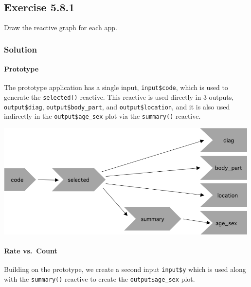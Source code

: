\documentclass[]{book}
\let\oldparagraph\paragraph
\renewcommand{\paragraph}[1]{\oldparagraph{#1}\mbox{}}
\begin{document}
\hypertarget{exercise-5.8.1}{%
\subsection*{Exercise 5.8.1}\label{exercise-5.8.1}}

Draw the reactive graph for each app.

\begin{solution}

\hypertarget{solution}{%
\subsubsection*{Solution}\label{solution}}

\hypertarget{prototype}{%
\paragraph{Prototype}\label{prototype}}

The prototype application has a single input, \texttt{input\$code}, which is used to
generate the \texttt{selected()} reactive. This reactive is used directly in 3
outputs, \texttt{output\$diag}, \texttt{output\$body\_part}, and \texttt{output\$location}, and it is
also used indirectly in the \texttt{output\$age\_sex} plot via the \texttt{summary()} reactive.

\includegraphics[width=5.20833in,height=\textheight]{images/5.8.1-prototype.png}

\hypertarget{rate-vs.count}{%
\paragraph{Rate vs.~Count}\label{rate-vs.count}}

Building on the prototype, we create a second input \texttt{input\$y} which is used
along with the \texttt{summary()} reactive to create the \texttt{output\$age\_sex} plot.


\end{solution}
\end{document}
